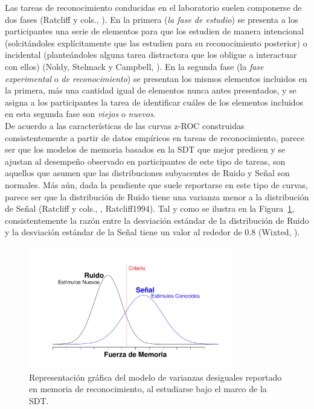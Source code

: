 Las tareas de reconocimiento conducidas en el laboratorio suelen componerse de dos fases (Ratcliff y cols., \citeyear{Ratcliff1992}). En la primera (\textit{la fase de estudio}) se presenta a los participantes una serie de elementos para que los estudien de manera intencional (solcitándoles explícitamente que las estudien para su reconocimiento posterior) o incidental (planteándoles alguna tarea distractora que los obligue a interactuar con ellos) (Noldy, Stelmack y Campbell, \citeyear{Noldy1990}). En la segunda fase (la \textit{fase experimental} o \textit{de reconocimiento}) se presentan los mismos elementos incluidos en la primera, más una cantidad igual de elementos nunca antes presentados, y se asigna a los participantes la tarea de identificar cuáles de los elementos incluidos en esta segunda fase son \textit{viejos} o \textit{nuevos}.\\

De acuerdo a las características de las curvas z-ROC construidas consistentemente a partir de datos empíricos en tareas de reconocimiento, parece ser que los modelos de memoria basados en la SDT que mejor predicen y se ajustan al desempeño observado en participantes de este tipo de tareas, son aquellos que asumen que las distribuciones subyacentes de Ruido y Señal son normales. Más aún, dada la pendiente que suele reportarse en este tipo de curvas, parece ser que la distribución de Ruido tiene una varianza menor a la distribución de Señal (Ratcliff y cols., \citeyear{ Ratcliff1992}, {Ratcliff1994}). Tal y como se ilustra en la Figura~\ref{fig:RM_SDT_2}, consistentemente la razón entre la desviación estándar de la distribución de Ruido y la desviación estándar de la Señal tiene un valor al rededor de 0.8 (Wixted, \citeyear{Wixted2007}).\\

\begin{figure}[th]
\centering
\includegraphics[width=0.80\textwidth]{Figures/RM_SDT_2} 
\caption[SDT en memoria de reconocimiento (varianzas desiguales)]{Representación gráfica del modelo de varianzas desiguales reportado en memoria de reconocimiento, al estudiarse bajo el marco de la SDT.}
\label{fig:RM_SDT_2}
\end{figure}















